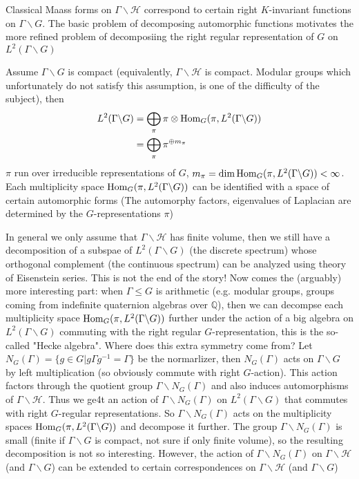 \documentclass[main]{subfiles}
\begin{document}
\begin{example}
Classical Maass forms on $\Gamma\backslash\mathcal H$ correspond to certain right $K$-invariant functions on $\Gamma\backslash G$. The basic problem of decomposing automorphic functions motivates the more refined problem of decomposiing the right regular representation of $G$ on $L^2(\Gamma\backslash G)$
\end{example}

\begin{theorem}
Assume $\Gamma\backslash G$ is compact (equivalently, $\Gamma\backslash\mathcal H$ is compact. Modular groups which unfortunately do not satisfy this assumption, is one of the difficulty of the subject), then
\begin{align*}
L^2(\Gamma\backslash G)&=\bigoplus_{\pi}\pi\otimes\operatorname{Hom}_G(\pi,L^2(\Gamma\backslash G)) \\
&=\bigoplus_{\pi}\pi^{\oplus m_\pi}
\end{align*}
$\pi$ run over irreducible representations of $G$, $m_\pi=\dim\operatorname{Hom}_G(\pi,L^2(\Gamma\backslash G))<\infty$. Each multiplicity space $\operatorname{Hom}_G(\pi,L^2(\Gamma\backslash G))$ can be identified with a space of certain automorphic forms (The automorphy factors, eigenvalues of Laplacian are determined by the $G$-representations $\pi$)
\end{theorem}

\begin{remark}
In general we only assume that $\Gamma\backslash\mathcal H$ has finite volume, then we still have a decomposition of a subspae of $L^2(\Gamma\backslash G)$ (the discrete spectrum) whose orthogonal complement (the continuous spectrum) can be analyzed using theory of Eisenstein series. This is not the end of the story! Now comes the (arguably) more interesting part: when $\Gamma\leq G$ is arithmetic (e.g. modular groups, groups coming from indefinite quaternion algebras over $\mathbb Q$), then we can decompse each multiplicity space $\operatorname{Hom}_G(\pi,L^2(\Gamma\backslash G))$ further under the action of a big algebra on $L^2(\Gamma\backslash G)$ commuting with the right regular $G$-representation, this is the so-called "Hecke algebra". Where does this extra symmetry come from? Let $N_G(\Gamma)=\{g\in G|g\Gamma g^{-1}=\Gamma\}$ be the normarlizer, then $N_G(\Gamma)$ acts on $\Gamma\backslash G$ by left multiplication (so obviously commute with right $G$-action). This action factors through the quotient group $\Gamma\backslash N_G(\Gamma)$ and also induces automorphisms of $\Gamma\backslash\mathcal H$. Thus we ge4t an action of $\Gamma\backslash N_G(\Gamma)$ on $L^2(\Gamma\backslash G)$ that commutes with right $G$-regular representations. So $\Gamma\backslash N_G(\Gamma)$ acts on the multiplicity spaces $\operatorname{Hom}_G(\pi,L^2(\Gamma\backslash G))$ and decompose it further. The group $\Gamma\backslash N_G(\Gamma)$ is small (finite if $\Gamma\backslash G$ is compact, not sure if only finite volume), so the resulting decomposition is not so interesting. However, the action of $\Gamma\backslash N_G(\Gamma)$ on $\Gamma\backslash \mathcal H$ (and $\Gamma\backslash G$) can be extended to certain correspondences on $\Gamma\backslash \mathcal H$ (and $\Gamma\backslash G$)
\end{remark}
\end{document}
